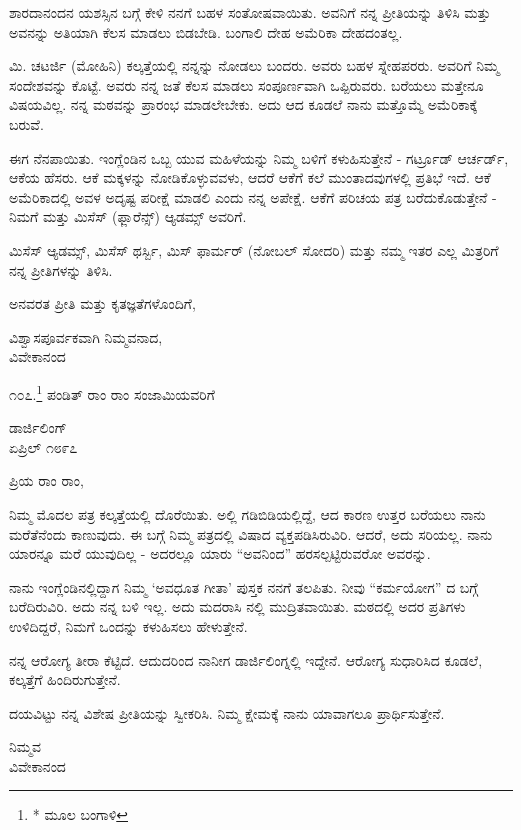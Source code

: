ಶಾರದಾನಂದನ ಯಶಸ್ಸಿನ ಬಗ್ಗೆ ಕೇಳಿ ನನಗೆ ಬಹಳ ಸಂತೋಷವಾಯಿತು. ಅವನಿಗೆ ನನ್ನ ಪ್ರೀತಿಯನ್ನು ತಿಳಿಸಿ ಮತ್ತು ಅವನನ್ನು ಅತಿಯಾಗಿ ಕೆಲಸ ಮಾಡಲು ಬಿಡಬೇಡಿ. ಬಂಗಾಲಿ ದೇಹ ಅಮೆರಿಕಾ ದೇಹದಂತಲ್ಲ.

ಮಿ. ಚಟರ್ಜಿ (ಮೋಹಿನಿ) ಕಲ್ಕತ್ತೆಯಲ್ಲಿ ನನ್ನನ್ನು ನೋಡಲು ಬಂದರು. ಅವರು ಬಹಳ ಸ್ನೇಹಪರರು. ಅವರಿಗೆ ನಿಮ್ಮ ಸಂದೇಶವನ್ನು ಕೊಟ್ಟೆ. ಅವರು ನನ್ನ ಜತೆ ಕೆಲಸ ಮಾಡಲು ಸಂಪೂರ್ಣವಾಗಿ ಒಪ್ಪಿರುವರು. ಬರೆಯಲು ಮತ್ತೇನೂ ವಿಷಯವಿಲ್ಲ. ನನ್ನ ಮಠವನ್ನು ಪ್ರಾರಂಭ ಮಾಡಲೇಬೇಕು. ಅದು ಆದ ಕೂಡಲೆ ನಾನು ಮತ್ತೊಮ್ಮೆ ಅಮೆರಿಕಾಕ್ಕೆ ಬರುವೆ.

ಈಗ ನೆನಪಾಯಿತು. ಇಂಗ್ಲೆಂಡಿನ ಒಬ್ಬ ಯುವ ಮಹಿಳೆಯನ್ನು ನಿಮ್ಮ ಬಳಿಗೆ ಕಳುಹಿಸುತ್ತೇನೆ - ಗರ್ಟ್ರೂಡ್ ಆರ್ಚರ್ಡ್, ಆಕೆಯ ಹೆಸರು. ಆಕೆ ಮಕ್ಕಳನ್ನು ನೋಡಿಕೊಳ್ಳುವವಳು, ಆದರೆ ಆಕೆಗೆ ಕಲೆ ಮುಂತಾದವುಗಳಲ್ಲಿ ಪ್ರತಿಭೆ ಇದೆ. ಆಕೆ ಅಮೆರಿಕಾದಲ್ಲಿ ಅವಳ ಅದೃಷ್ಟ ಪರೀಕ್ಷೆ ಮಾಡಲಿ ಎಂದು ನನ್ನ ಅಪೇಕ್ಷೆ. ಆಕೆಗೆ ಪರಿಚಯ ಪತ್ರ ಬರೆದುಕೊಡುತ್ತೇನೆ - ನಿಮಗೆ ಮತ್ತು ಮಿಸೆಸ್ (ಫ್ಲಾರೆನ್ಸ್) ಆ್ಯಡಮ್ಸ್ ಅವರಿಗೆ.

ಮಿಸೆಸ್ ಆ್ಯಡಮ್ಸ್, ಮಿಸೆಸ್ ಥರ್ಸ್ಬಿ, ಮಿಸ್ ಫಾರ್ಮರ್ (ನೋಬಲ್ ಸೋದರಿ) ಮತ್ತು ನಮ್ಮ ಇತರ ಎಲ್ಲ ಮಿತ್ರರಿಗೆ ನನ್ನ ಪ್ರೀತಿಗಳನ್ನು ತಿಳಿಸಿ.

ಅನವರತ ಪ್ರೀತಿ ಮತ್ತು ಕೃತಜ್ಞತೆಗಳೊಂದಿಗೆ,

\begin{flushright}
ವಿಶ್ವಾಸಪೂರ್ವಕವಾಗಿ ನಿಮ್ಮವನಾದ,\\ವಿವೇಕಾನಂದ
\end{flushright}

೧೦೭.\footnote{* ಮೂಲ ಬಂಗಾಳಿ} ಪಂಡಿತ್ ರಾಂ ರಾಂ ಸಂಜಾಮಿಯವರಿಗೆ

\begin{flushright}
ಡಾರ್ಜಿಲಿಂಗ್\\ಏಪ್ರಿಲ್ ೧೮೯೭
\end{flushright}

ಪ್ರಿಯ ರಾಂ ರಾಂ,

ನಿಮ್ಮ ಮೊದಲ ಪತ್ರ ಕಲ್ಕತ್ತೆಯಲ್ಲಿ ದೊರೆಯಿತು. ಅಲ್ಲಿ ಗಡಿಬಿಡಿಯಲ್ಲಿದ್ದೆ, ಆದ ಕಾರಣ ಉತ್ತರ ಬರೆಯಲು ನಾನು ಮರೆತೆನೆಂದು ಕಾಣುವುದು. ಈ ಬಗ್ಗೆ ನಿಮ್ಮ ಪತ್ರದಲ್ಲಿ ವಿಷಾದ ವ್ಯಕ್ತಪಡಿಸಿರುವಿರಿ. ಆದರೆ, ಅದು ಸರಿಯಲ್ಲ. ನಾನು ಯಾರನ್ನೂ ಮರೆ ಯುವುದಿಲ್ಲ - ಅದರಲ್ಲೂ ಯಾರು “ಅವನಿಂದ” ಹರಸಲ್ಪಟ್ಟಿರುವರೋ ಅವರನ್ನು.

ನಾನು ಇಂಗ್ಲೆಂಡಿನಲ್ಲಿದ್ದಾಗ ನಿಮ್ಮ ‘ಅವಧೂತ ಗೀತಾ’ ಪುಸ್ತಕ ನನಗೆ ತಲಪಿತು. ನೀವು “ಕರ್ಮಯೋಗ” ದ ಬಗ್ಗೆ ಬರೆದಿರುವಿರಿ. ಅದು ನನ್ನ ಬಳಿ ಇಲ್ಲ. ಅದು ಮದರಾಸಿ ನಲ್ಲಿ ಮುದ್ರಿತವಾಯಿತು. ಮಠದಲ್ಲಿ ಅದರ ಪ್ರತಿಗಳು ಉಳಿದಿದ್ದರೆ, ನಿಮಗೆ ಒಂದನ್ನು ಕಳುಹಿಸಲು ಹೇಳುತ್ತೇನೆ.

ನನ್ನ ಆರೋಗ್ಯ ತೀರಾ ಕೆಟ್ಟಿದೆ. ಆದುದರಿಂದ ನಾನೀಗ ಡಾರ್ಜಿಲಿಂಗ್ನಲ್ಲಿ ಇದ್ದೇನೆ. ಆರೋಗ್ಯ ಸುಧಾರಿಸಿದ ಕೂಡಲೆ, ಕಲ್ಕತ್ತೆಗೆ ಹಿಂದಿರುಗುತ್ತೇನೆ.

ದಯವಿಟ್ಟು ನನ್ನ ವಿಶೇಷ ಪ್ರೀತಿಯನ್ನು ಸ್ವೀಕರಿಸಿ. ನಿಮ್ಮ ಕ್ಷೇಮಕ್ಕೆ ನಾನು ಯಾವಾಗಲೂ ಪ್ರಾರ್ಥಿಸುತ್ತೇನೆ.

\begin{flushright}
ನಿಮ್ಮವ\\ವಿವೇಕಾನಂದ
\end{flushright}

